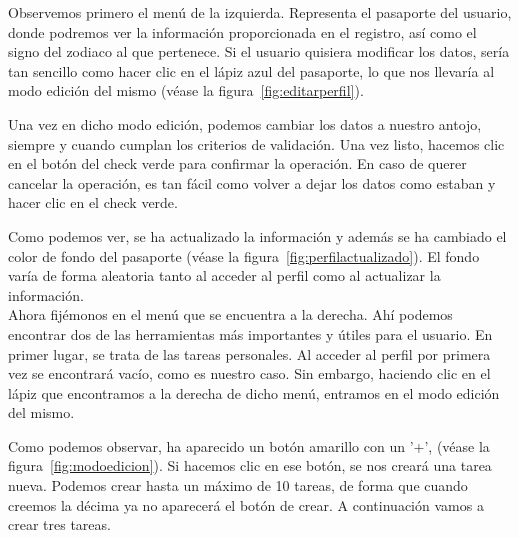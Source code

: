 
Observemos primero el menú de la izquierda. Representa el pasaporte del usuario, donde podremos ver la información proporcionada en el registro, así como el signo del zodiaco al que pertenece. Si el usuario quisiera modificar los datos, sería tan sencillo como hacer clic en el lápiz azul del pasaporte, lo que nos llevaría al modo edición del mismo {(v\'ease la figura~\ref{fig:editarperfil})}.\\


\clearpage

Una vez en dicho modo edición, podemos cambiar los datos a nuestro antojo, siempre y cuando cumplan los criterios de validación. Una vez listo, hacemos clic en el botón del check verde para confirmar la operación. En caso de querer cancelar la operación, es tan fácil como volver a dejar los datos como estaban y hacer clic en el check verde.\\


Como podemos ver, se ha actualizado la información y además se ha cambiado el color de fondo del pasaporte {(v\'ease la figura~\ref{fig:perfilactualizado})}. El fondo varía de forma aleatoria tanto al acceder al perfil como al actualizar la información.\\

Ahora fijémonos en el menú que se encuentra a la derecha. Ahí podemos encontrar dos de las herramientas más importantes y útiles para el usuario. En primer lugar, se trata de las tareas personales. Al acceder al perfil por primera vez se encontrará vacío, como es nuestro caso. Sin embargo, haciendo clic en el lápiz que encontramos a la derecha de dicho menú, entramos en el modo edición del mismo.\\


Como podemos observar, ha aparecido un botón amarillo con un '+', {(v\'ease la figura~\ref{fig:modoedicion})}. Si hacemos clic en ese botón, se nos creará una tarea nueva. Podemos crear hasta un máximo de 10 tareas, de forma que cuando creemos la décima ya no aparecerá el botón de crear. A continuación vamos a crear tres tareas.\\

